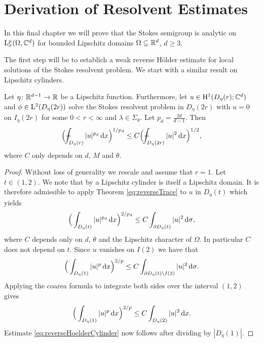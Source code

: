 \chapter{Derivation of Resolvent Estimates}

In this final chapter we will prove that the Stokes semigroup is analytic on $\mathrm{L}^p_\sigma(\Omega, \mathbb{C}^d)$ for bounded Lipschitz domains $\Omega \subseteq \mathbb{R}^d$, $d \geq 3$.

The first step will be to establich a weak reverse H\"older estimate for local solutions of the Stokes resolvent problem. 
We start with a similar result on Lipschitz cylinders.

\begin{lem}
  \label{lem:reverseHoelderCylinder}
  Let $\eta \colon \mathbb{R}^{d - 1} \to \mathbb{R}$ be a Lipschitz function.
  Furthermore, let $u \in \mathrm{H}^1(D_\eta(r); \mathbb{C}^d)$ and $\phi \in \mathrm{L}^2(D_\eta(2r))$ solve the Stokes resolvent problem in $D_\eta(2r)$ with $u = 0$ on $I_\eta(2r)$ for some $0 < r < \infty$ and $\lambda \in \Sigma_\theta$.
  Let $p_d = \frac{2d}{d - 1}$.
  Then 
  \begin{align}
    \label{eq:reverseHoelderCylinder}
    \Big( \dashint_{D_\eta(r)} |u|^{p_d} \d x \Big)^{1/p_d} \leq C \Big( \dashint_{D_\eta(2r)} |u|^2 \d x \Big)^{1/2},
  \end{align}
  where $C$ only depends on $d$, $M$ and $\theta$.
\end{lem}

\begin{proof}
  Without loss of generality we rescale and assume that $r = 1$.
  Let $t \in (1,2)$. 
  We note that by \cite[Lemma 1.3.25]{tolksdorf} a Lipschitz cylinder is itself a Lipschitz domain.
  It is therefore admissible to apply Theorem \ref{eq:reverseTrace} to $u$ in $D_\eta(t)$ which yields
  \begin{align*}
    \Big( \int_{D_\eta(t)} |u|^{p_d} \, {\operatorname{d}\!{x}} \Big)^{2/p_d} \leq C \int_{\partial D_\eta(t)} |u|^2 \, {\operatorname{d}\!{\sigma}},
  \end{align*}
  where $C$ depends only on $d$, $\theta$ and the Lipschitz character of $\Omega$. In particular $C$ does not depend on $t$.
  Since $u$ vanishes on $I(2)$ we have that
  \begin{align*}
    \Big( \int_{D_\eta(1)} |u|^p \, {\operatorname{d}\!{x}} \Big)^{2/p} \leq C \int_{\partial D_\eta(t) \setminus I(2)} |u|^2 \, {\operatorname{d}\!{\sigma}}.
  \end{align*}
  Applying the coarea formula to integrate both sides over the interval $(1,2)$ gives
  \begin{align*}
    \Big( \int_{D_\eta(1)} |u|^p \, {\operatorname{d}\!{x}} \Big)^{2/p} \leq C \int_{D_\eta(2)} |u|^2 \, {\operatorname{d}\!{x}}.
  \end{align*}
  Estimate \eqref{eq:reverseHoelderCylinder} now follows after dividing by $|D_\eta(1)|$.
\end{proof}


